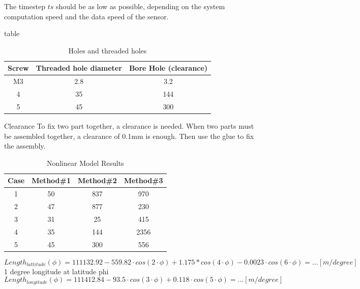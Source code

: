 \documentclass[12pt,a4paper]{article}
\begin{document}
The timestep $ts$ should be as low as possible, depending on the system computation speed and the data speed of the sensor.



table

\begin{table}[ht]
	\caption{Holes and threaded holes} %
	\centering %
	\begin{tabular}{c c c} %
		\hline\hline %
		Screw & Threaded hole diameter & Bore Hole (clearance) \\ [0.5ex] %
		\hline %
		M3 & 2.8 & 3.2 \\ %
		4 & 35 & 144 \\
		5 & 45 & 300 \\ [1ex] %
		\hline %
	\end{tabular}\label{table:nonlin} %
\end{table}

Clearance
To fix two part together, a clearance is needed.
When two parts must be assembled together, a clearance of 0.1mm is enough. Then use the glue to fix the assembly. 



\begin{table}[ht]
	\caption{Nonlinear Model Results} %
	\centering %
	\begin{tabular}{c c c c} %
		\hline\hline %
		Case & Method\#1 & Method\#2 & Method\#3 \\ [0.5ex] %
		\hline %
		1 & 50 & 837 & 970 \\ %
		2 & 47 & 877 & 230 \\
		3 & 31 & 25 & 415 \\
		4 & 35 & 144 & 2356 \\
		5 & 45 & 300 & 556 \\ [1ex] %
		\hline %
	\end{tabular}\label{table:nonlin} %
\end{table}



\begin{equation}
	Length_{lattitude}(\phi) = 111132.92-559.82 \cdot cos(2 \cdot \phi)+1.175*cos(4 \cdot \phi)-0.0023 \cdot cos(6 \cdot \phi)= ... [m/degree]
\end{equation}
 1 degree longitude at latitude phi
\begin{equation}
	Length_{longitude}(\phi) =
	111412.84-93.5 \cdot cos(3 \cdot \phi)+ 0.118 \cdot cos(5 \cdot \phi)= ... [m/degree]
\end{equation}
\end{document}
